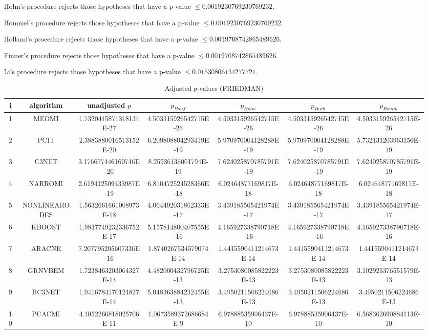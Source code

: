 \documentclass[a4paper,10pt]{article}
\begin{document}
\begin{landscape}
Holm's procedure rejects those hypotheses that have a p-value $\le0.0019230769230769232$.


Hommel's procedure rejects those hypotheses that have a p-value $\le0.0019230769230769232$.


Holland's procedure rejects those hypotheses that have a p-value $\le0.0019708742865489626$.


Finner's procedure rejects those hypotheses that have a p-value $\le0.0019708742865489626$.


Li's procedure rejects those hypotheses that have a p-value $\le0.01530806134277721$.



\newpage

\begin{table}[!htp]
\centering\scriptsize
\caption{Adjusted $p$-values (FRIEDMAN)}
\begin{tabular}{ccccccc}
i&algorithm&unadjusted $p$&$p_{Bonf}$&$p_{Holm}$&$p_{Hoch}$&$p_{Homm}$\\
\hline
1&MEOMI&1.7320445871318134E-27&4.503315926542715E-26&4.503315926542715E-26&4.503315926542715E-26&4.503315926542715E-26\\
2&PCIT&2.3883880016513152E-20&6.209808804293419E-19&5.970970004128288E-19&5.970970004128288E-19&5.732131203963156E-19\\
3&C3NET&3.176677446160746E-20&8.25936136001794E-19&7.624025870785791E-19&7.624025870785791E-19&7.624025870785791E-19\\
4&NARROMI&2.619412509433987E-19&6.810472524528366E-18&6.02464877169817E-18&6.02464877169817E-18&6.02464877169817E-18\\
5&NONLINEARODES&1.5632661661008973E-18&4.064492031862333E-17&3.439185565421974E-17&3.439185565421974E-17&3.439185565421974E-17\\
6&KBOOST&1.9837749232336752E-17&5.157814800407555E-16&4.165927338790718E-16&4.165927338790718E-16&4.165927338790718E-16\\
7&ARACNE&7.207795205607336E-16&1.8740267534579074E-14&1.4415590411214673E-14&1.4415590411214673E-14&1.4415590411214673E-14\\
8&GRNVBEM&1.7238463203064327E-14&4.482000432796725E-13&3.2753080085822223E-13&3.2753080085822223E-13&3.102923376551579E-13\\
9&BC3NET&1.9416784170124827E-14&5.048363884232455E-13&3.4950211506224686E-13&3.4950211506224686E-13&3.4950211506224686E-13\\
10&PCACMI&4.1052266818025706E-11&1.0673589372686684E-9&6.97888535906437E-10&6.97888535906437E-10&6.568362690884113E-10\\

\end{tabular}
\end{table}
\end{landscape}
\end{document}

